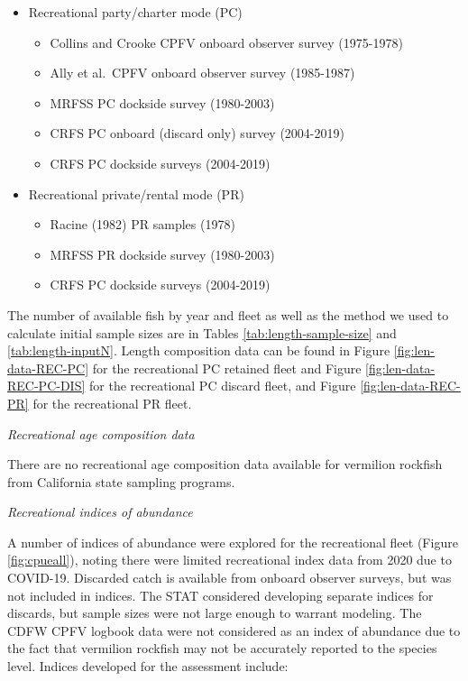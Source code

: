 \documentclass[
  english,
  a4paper,
]{article}
\providecommand{\tightlist}{%
  \setlength{\itemsep}{0pt}\setlength{\parskip}{0pt}}
\begin{document}
\begin{itemize}
\tightlist
\item
  Recreational party/charter mode (PC)

  \begin{itemize}
  \tightlist
  \item
    Collins and Crooke CPFV onboard observer survey (1975-1978)
  \item
    Ally et al.~CPFV onboard observer survey (1985-1987)
  \item
    MRFSS PC dockside survey (1980-2003)
  \item
    CRFS PC onboard (discard only) survey (2004-2019)
  \item
    CRFS PC dockside surveys (2004-2019)
  \end{itemize}
\item
  Recreational private/rental mode (PR)

  \begin{itemize}
  \tightlist
  \item
    Racine (1982) PR samples (1978)
  \item
    MRFSS PR dockside survey (1980-2003)
  \item
    CRFS PC dockside surveys (2004-2019)
  \end{itemize}
\end{itemize}

The number of available fish by year and fleet as well as the method we used to
calculate initial sample sizes are in Tables \ref{tab:length-sample-size} and \ref{tab:length-inputN}.
Length composition data can be found in Figure
\ref{fig:len-data-REC-PC} for the recreational PC retained fleet and Figure \ref{fig:len-data-REC-PC-DIS} for
the recreational PC discard fleet, and Figure \ref{fig:len-data-REC-PR} for the recreational PR fleet.

\emph{Recreational age composition data}

There are no recreational age composition data available for vermilion rockfish from California state
sampling programs.

\emph{Recreational indices of abundance}

A number of indices of abundance were explored for the recreational fleet (Figure \ref{fig:cpueall}), noting there were limited recreational index data from 2020
due to COVID-19. Discarded catch is available from onboard observer surveys, but
was not included in indices. The STAT considered developing separate indices for
discards, but sample sizes were not large enough to warrant modeling. The CDFW
CPFV logbook data were not considered as an index of abundance due to the fact that
vermilion rockfish may not be accurately reported to the species level. Indices
developed for the assessment include:
\end{document}
